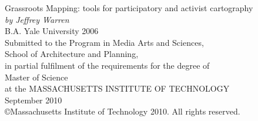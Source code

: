 \documentclass[11pt,oneside,notitlepage]{report}
\begin{document}
\date{}
\author{
}
\maketitle

\setlength{\parindent}{0pt}
\setlength{\parskip}{0.8em}

\Large{Grassroots Mapping: tools for participatory and activist cartography \vspace{10px} \\ 
\emph{by Jeffrey Warren}\vspace{10px} \\ 
B.A. Yale University 2006} \vspace{20px} \\ 
\large{Submitted to the Program in Media Arts and Sciences,\\
School of Architecture and Planning,\\
in partial fulfilment of the requirements for the degree of\\
Master of Science\\
at the {\sc MASSACHUSETTS INSTITUTE OF TECHNOLOGY}\\
September 2010\\ 
\copyright Massachusetts Institute of Technology 2010. All rights reserved.}\\ \vspace{20px}
\end{document}
